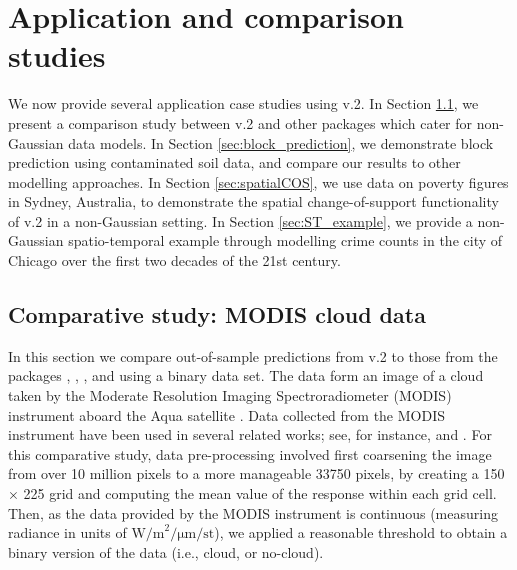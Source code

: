\documentclass[nojss]{jss}
\begin{document}
\section{Application and comparison studies}\label{SEC:ApplicationStudy}


We now provide several application case studies using  v.2.
In Section \ref{sec:04-01:MODIS}, we present a comparison study between  v.2 and other packages which cater for non-Gaussian data models. 
In Section \ref{sec:block_prediction}, we demonstrate block prediction using contaminated soil data, and compare our results to other modelling approaches. 
In Section \ref{sec:spatialCOS}, we use data on poverty figures in Sydney, Australia, to demonstrate the spatial change-of-support functionality of  v.2 in a non-Gaussian setting.
In Section \ref{sec:ST_example}, we provide a non-Gaussian spatio-temporal example through modelling crime counts in the city of Chicago over the first two decades of the 21st century.



\subsection{Comparative study: MODIS cloud data}\label{sec:04-01:MODIS}


In this section we compare out-of-sample predictions from  v.2 to those from the  packages  \citep{Lindgren_2015_R-INLA},   \citep{Finley_2020_spNNGP},  \citep{Finley_2015_spBayes}, and  \citep{Wood_2017_GAM:R} using a binary data set. 
The data form an image of a cloud taken by the Moderate Resolution Imaging Spectroradiometer (MODIS) instrument aboard the Aqua satellite \citep{MODIS_satelitte}. 
Data collected from the MODIS instrument have been used in several related works; see, for instance, \cite{Sengupta_2016_MODIS} and  \cite{ZammitMangion_2021_Deep_compositional_spatial_model}.
For this comparative study, data pre-processing involved first coarsening the image from over 10 million pixels to a more manageable 33750 pixels, by creating a 150 $\times$ 225 grid and computing the mean value of the response within each grid cell. 
Then, as the data provided by the MODIS instrument is continuous (measuring radiance in units of $\text{W/m}^2/\si{\um}/\text{st}$), we applied a reasonable threshold to obtain a binary version of the data (i.e., cloud, or no-cloud).
\end{document}
